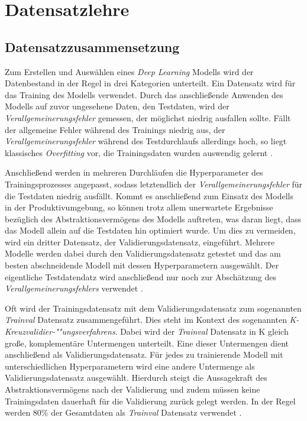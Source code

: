 \section{Datensatzlehre}

\subsection*{Datensatzzusammensetzung}

Zum Erstellen und Auswählen eines \textit{Deep Learning} Modells wird der Datenbestand in der Regel in drei Kategorien unterteilt. Ein Datensatz wird für das Training des Modells verwendet. Durch das anschließende Anwenden des Modells auf zuvor ungesehene Daten, den Testdaten, wird der \textit{Verallgemeinerungsfehler} gemessen, der möglichst niedrig ausfallen sollte. Fällt der allgemeine Fehler während des Trainings niedrig aus, der \textit{Verallgemeinerungsfehler} während des Testdurchlaufs allerdings hoch, so liegt klassisches \textit{Overfitting} vor, die Trainingsdaten wurden auswendig gelernt \cite{AurelienGeron.2018}. 

Anschließend werden in mehreren Durchläufen die Hyperparameter des Trainingsprozesses angepasst, sodass letztendlich der \textit{Verallgemeinerungsfehler} für die Testdaten niedrig ausfällt. Kommt es anschließend zum Einsatz des Modells in der Produktivumgebung, so können trotz allem unerwartete Ergebnisse bezüglich des Abstraktionsvermögens des Modells auftreten, was daran liegt, dass das Modell allein auf die Testdaten hin optimiert wurde. Um dies zu vermeiden, wird ein dritter Datensatz, der Validierungsdatensatz, eingeführt. Mehrere Modelle werden dabei durch den Validierungsdatensatz getestet und das am besten abschneidende Modell mit dessen Hyperparametern ausgewählt. Der eigentliche Testdatendatz wird anschließend nur noch zur Abschätzung des \textit{Verallgemeinerungsfehlers} verwendet \cite{AurelienGeron.2018}. 

Oft wird der Trainingsdatensatz mit dem Validierungsdatensatz zum sogenannten \textit{Trainval} Datensatz zusammengeführt. Dies steht im Kontext des sogenannten \textit{K-Kreuzvalidier-""ungsverfahrens}. Dabei wird der \textit{Trainval} Datensatz in K gleich große, komplementäre Untermengen unterteilt. Eine dieser Untermengen dient anschließend als Validierungsdatensatz. Für jedes zu trainierende Modell mit unterschiedlichen Hyperparametern wird eine andere Untermenge als Validierungsdatensatz ausgewählt. Hierdurch steigt die Aussagekraft des Abstraktionsvermögens nach der Validierung und zudem müssen keine Trainingsdaten dauerhaft für die Validierung zurück gelegt werden. In der Regel werden 80\% der Gesamtdaten als \textit{Trainval} Datensatz verwendet \cite{AurelienGeron.2018}.

